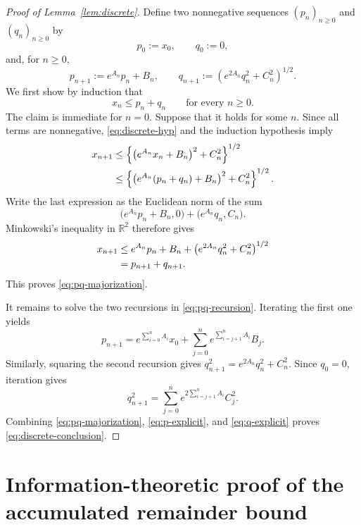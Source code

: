\documentclass[11pt]{article}
\theoremstyle{definition}
\newcommand{\R}{\mathbb{R}}
\begin{document}
\begin{proof}[Proof of Lemma~\ref{lem:discrete}]
Define two nonnegative sequences $(p_n)_{n\ge0}$ and
$(q_n)_{n\ge0}$ by
\[
    p_0:=x_0,
    \qquad
    q_0:=0,
\]
and, for $n\ge0$,
\begin{equation}
    p_{n+1}:=e^{A_n}p_n+B_n,
    \qquad
    q_{n+1}:=\left(e^{2A_n}q_n^2+C_n^2\right)^{1/2}.
    \label{eq:pq-recursion}
\end{equation}
We first show by induction that
\begin{equation}
    x_n\le p_n+q_n
    \qquad\text{for every }n\ge0.
    \label{eq:pq-majorization}
\end{equation}
The claim is immediate for $n=0$. Suppose that it holds for some
$n$. Since all terms are nonnegative, \eqref{eq:discrete-hyp} and
the induction hypothesis imply
\begin{align}
    x_{n+1}
    &\le
    \left\{
        \bigl(e^{A_n}x_n+B_n\bigr)^2+C_n^2
    \right\}^{1/2}\notag\\
    &\le
    \left\{
        \bigl(e^{A_n}(p_n+q_n)+B_n\bigr)^2+C_n^2
    \right\}^{1/2}.\notag
\end{align}
Write the last expression as the Euclidean norm of the sum
\[
    \bigl(e^{A_n}p_n+B_n,0\bigr)
    +
    \bigl(e^{A_n}q_n,C_n\bigr).
\]
Minkowski's inequality in $\R^2$ therefore gives
\begin{align}
    x_{n+1}
    &\le
    e^{A_n}p_n+B_n
    +\left(e^{2A_n}q_n^2+C_n^2\right)^{1/2}\notag\\
    &=p_{n+1}+q_{n+1}.\notag
\end{align}
This proves \eqref{eq:pq-majorization}.

It remains to solve the two recursions in
\eqref{eq:pq-recursion}. Iterating the first one yields
\begin{equation}
    p_{n+1}
    =
    e^{\sum_{i=0}^nA_i}x_0
    +\sum_{j=0}^n
        e^{\sum_{i=j+1}^nA_i}B_j.
    \label{eq:p-explicit}
\end{equation}
Similarly, squaring the second recursion gives
$q_{n+1}^2=e^{2A_n}q_n^2+C_n^2$. Since $q_0=0$, iteration gives
\begin{equation}
    q_{n+1}^2
    =
    \sum_{j=0}^n
        e^{2\sum_{i=j+1}^nA_i}C_j^2.
    \label{eq:q-explicit}
\end{equation}
Combining \eqref{eq:pq-majorization},
\eqref{eq:p-explicit}, and \eqref{eq:q-explicit} proves
\eqref{eq:discrete-conclusion}.
\end{proof}

\section{Information-theoretic proof of the accumulated remainder bound}
\label{app:remainder}
\end{document}
